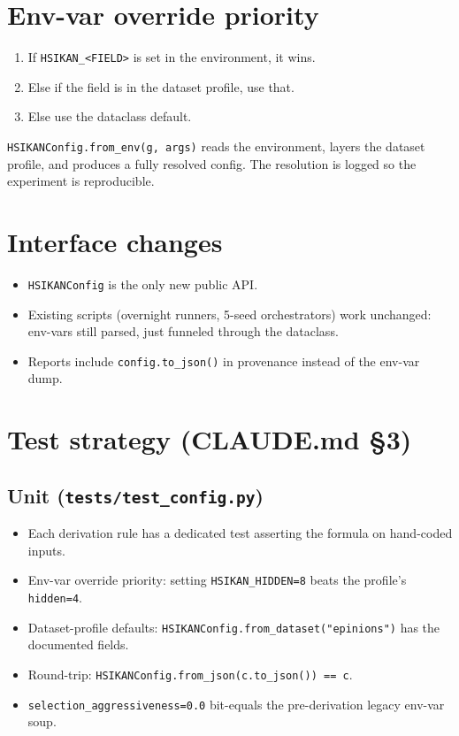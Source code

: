 \documentclass[11pt,a4paper]{article}
\begin{document}
\section{Env-var override priority}
\begin{enumerate}
\item If \texttt{HSIKAN\_<FIELD>} is set in the environment, it wins.
\item Else if the field is in the dataset profile, use that.
\item Else use the dataclass default.
\end{enumerate}
\texttt{HSIKANConfig.from\_env(g, args)} reads the environment, layers
the dataset profile, and produces a fully resolved config.  The
resolution is logged so the experiment is reproducible.

\section{Interface changes}
\begin{itemize}
\item \texttt{HSIKANConfig} is the only new public API.
\item Existing scripts (overnight runners, 5-seed orchestrators) work
  unchanged: env-vars still parsed, just funneled through the dataclass.
\item Reports include \texttt{config.to\_json()} in provenance instead
  of the env-var dump.
\end{itemize}

\section{Test strategy (CLAUDE.md \S3)}

\subsection*{Unit (\texttt{tests/test\_config.py})}
\begin{itemize}
\item Each derivation rule has a dedicated test asserting the formula
  on hand-coded inputs.
\item Env-var override priority: setting \texttt{HSIKAN\_HIDDEN=8}
  beats the profile's \texttt{hidden=4}.
\item Dataset-profile defaults: \texttt{HSIKANConfig.from\_dataset("epinions")}
  has the documented fields.
\item Round-trip: \texttt{HSIKANConfig.from\_json(c.to\_json()) == c}.
\item \texttt{selection\_aggressiveness=0.0} bit-equals the
  pre-derivation legacy env-var soup.
\end{itemize}
\end{document}
